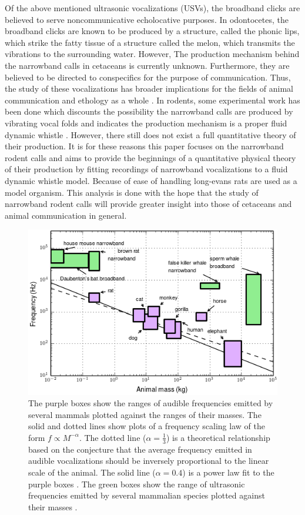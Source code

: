 \documentclass[superscriptaddress, twocolumn, prl]{revtex4}
\begin{document}
Of the above mentioned ultrasonic vocalizations (USVs), the broadband clicks are believed to serve noncommunicative echolocative purposes. In odontocetes, the broadband clicks are known to be produced by a structure, called the phonic lips, which strike the fatty tissue of a structure called the melon, which transmits the vibrations to the surrounding water. However, The production mechanism behind the narrowband calls in cetaceans is currently unknown. Furthermore, they are believed to be directed to conspecifics for the purpose of communication. Thus, the study of these vocalizations has broader implications for the fields of animal communication and ethology as a whole \cite{Reidenberg2010}. In rodents, some experimental work has been done which discounts the possibility the narrowband calls are produced by vibrating vocal folds and indicates the production mechanism is a proper fluid dynamic whistle \cite{Riede2011,Riede2011a,Roberts1975}. However, there still does not exist a full quantitative theory of their production. It is for these reasons this paper focuses on the narrowband rodent calls and aims to provide the beginnings of a quantitative physical theory of their production by fitting recordings of narrowband vocalizations to a fluid dynamic whistle model. Because of ease of handling long-evans rats are used as a model organism. This analysis is done with the hope that the study of narrowband rodent calls will provide greater insight into those of cetaceans and animal communication in general.
\begin{figure}[!ht]
\centering
\includegraphics[width=\columnwidth]{frequency_scaling.png}
\caption{\label{fig:frequency_scaling} The purple boxes show the ranges of audible frequencies emitted by several mammals plotted against the ranges of their masses. The solid and dotted lines show plots of a frequency scaling law of the form $f\propto M^{-\alpha}$. The dotted line ($\alpha=\frac{1}{3}$) is a theoretical relationship based on the conjecture that the average frequency emitted in audible vocalizations should be inversely proportional to the linear scale of the animal. The solid line ($\alpha=0.4$) is a power law fit to the purple boxes \cite{Brudzynski2010}. The green boxes show the range of ultrasonic frequencies emitted by several mammalian species plotted against their masses \cite{white1998,berry1970natural,Fenton1998,Jones2006,bogdanowicz1994,Frankel2009,Whitehead2009,Rendell1999,Kastelein2000,Jefferson1993}.}
\end{figure}
\end{document}
